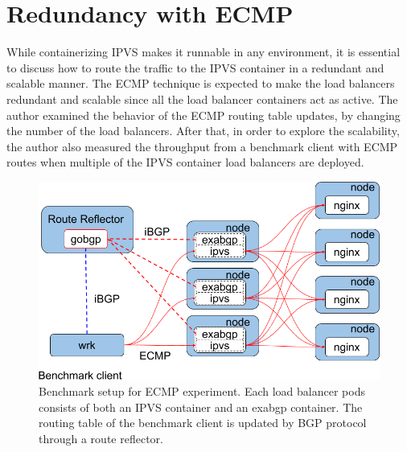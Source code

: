 \FloatBarrier

\section{Redundancy with ECMP}

While containerizing IPVS makes it runnable in any environment, it is essential to discuss how to route the traffic to the IPVS container in a redundant and scalable manner.
The ECMP technique is expected to make the load balancers redundant and scalable since all the load balancer containers act as active.
The author examined the behavior of the ECMP routing table updates, by changing the number of the load balancers.
After that, in order to explore the scalability, the author also measured the throughput from a benchmark client with ECMP routes when multiple of the IPVS container load balancers are deployed.

\begin{figure}[h]
  \centering
  \includegraphics[width=0.9\columnwidth]{Figs/lb_ecmp_schem}

  \par\bigskip
  \centering
  \begin{minipage}{0.9\columnwidth}
    \caption[Benchmark setup for ECMP experiment]{
      Benchmark setup for ECMP experiment.
      Each load balancer pods consists of both an IPVS container and an exabgp container.
      The routing table of the benchmark client is updated by BGP protocol through a route reflector.
    }
    \label{fig:ecmp-benchmark-schem}
  \end{minipage}
\end{figure}

